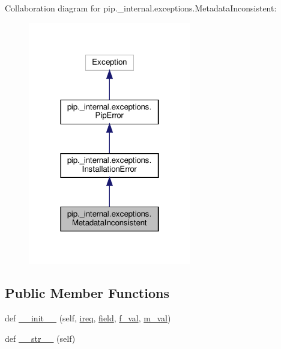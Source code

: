 Collaboration diagram for pip.\+\_\+internal.\+exceptions.\+Metadata\+Inconsistent\+:
\nopagebreak
\begin{figure}[H]
\begin{center}
\leavevmode
\includegraphics[width=202pt]{classpip_1_1__internal_1_1exceptions_1_1MetadataInconsistent__coll__graph}
\end{center}
\end{figure}
\subsection*{Public Member Functions}
\begin{DoxyCompactItemize}
\item 
def \hyperlink{classpip_1_1__internal_1_1exceptions_1_1MetadataInconsistent_a2c6e869cf784c9f655f8ac205abe0f3f}{\+\_\+\+\_\+init\+\_\+\+\_\+} (self, \hyperlink{classpip_1_1__internal_1_1exceptions_1_1MetadataInconsistent_af469d5c9de7bc37861a96cf4c014d85a}{ireq}, \hyperlink{classpip_1_1__internal_1_1exceptions_1_1MetadataInconsistent_a7020775c57fdef509df4f7459df10e07}{field}, \hyperlink{classpip_1_1__internal_1_1exceptions_1_1MetadataInconsistent_ad3e2f24752840d445010d1a0ee964dbf}{f\+\_\+val}, \hyperlink{classpip_1_1__internal_1_1exceptions_1_1MetadataInconsistent_a486ebaaf88767df460bba1576cd8244b}{m\+\_\+val})
\item 
def \hyperlink{classpip_1_1__internal_1_1exceptions_1_1MetadataInconsistent_a389c52139de6a6d1b751d43ec9162b22}{\+\_\+\+\_\+str\+\_\+\+\_\+} (self)
\end{DoxyCompactItemize}
